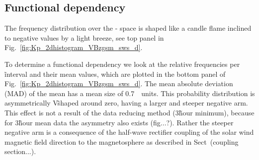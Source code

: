 \subsection{Functional dependency}
The frequency distribution over the \Kp-\vBz{} space is shaped like a candle flame inclined to negative values by a light breeze, see top panel in Fig.~\ref{fig:Kp_2dhistogram_VBzgsm_sws_d}.
\begin{figure}
\end{figure}

To determine a functional dependency we look at the relative frequencies per \vBz\~interval and their mean \Kp{} values, which are plotted in the bottom panel of Fig.~\ref{fig:Kp_2dhistogram_VBzgsm_sws_d}. The mean absolute deviation (MAD) of the mean has a mean size of \SI{0.7}{\Kp~units}. This probability distribution is asymmetrically V\~shaped around zero, having a larger and steeper negative arm. This effect is not a result of the data reducing method (3\~hour minimum), because for 3\~hour mean data the asymmetry also exists (fig...?). Rather the steeper negative arm is a consequence of the half-wave rectifier coupling of the solar wind magnetic field direction to the magnetosphere as described in Sect~(coupling section...).\\

